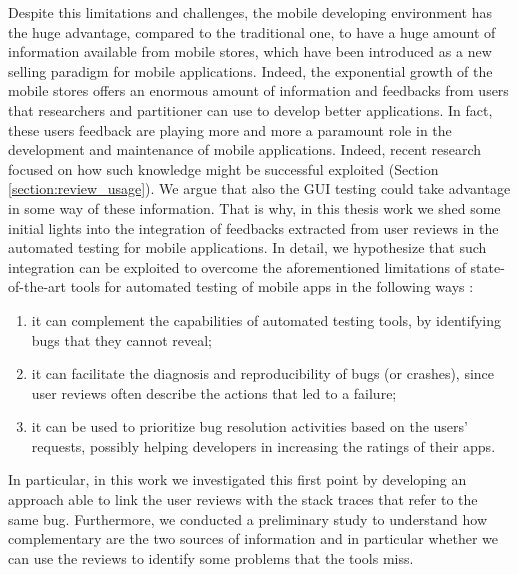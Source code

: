 Despite this limitations and challenges, the mobile developing environment has the huge advantage, compared to the traditional one, to have a huge amount of information available from mobile stores, which have been introduced as a new selling paradigm for mobile applications. Indeed, the exponential growth of the mobile stores offers an enormous amount of information and feedbacks from users that researchers and partitioner can use to develop better applications. In fact, these users feedback are playing more and more a paramount role in the development and maintenance of mobile applications. Indeed, recent research focused on how such knowledge might be successful exploited (Section \ref{section:review_usage}). 
We argue that also the GUI testing could take advantage in some way of these information. That is why, in this thesis work we shed some initial lights into the integration of feedbacks extracted from user reviews in the automated testing for mobile applications.
In detail, we hypothesize that such integration can be exploited to overcome the aforementioned limitations of state-of-the-art tools for automated testing of mobile apps in the following ways \cite{cristal}: 
\begin{enumerate}
\item it can complement the capabilities of automated testing tools, by identifying bugs that they cannot reveal; 
\item it can facilitate the diagnosis and reproducibility of bugs (or crashes), since user reviews often describe the actions that led to a failure; 
\item it can be used to prioritize bug resolution activities based on the users' requests, possibly helping developers in increasing the ratings of their apps.
\end{enumerate} 
In particular, in this work we investigated this first point by developing an approach able to link the user reviews with the stack traces that refer to the same bug. Furthermore, we conducted a preliminary study to understand how complementary are the two sources of information and in particular whether we can use the reviews to identify some problems that the tools miss. 

